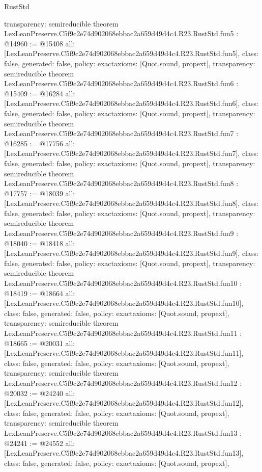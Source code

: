 \begin{lexlean}{RustStd}
\begin{coremodule}
{  transparency: semireducible
}
theorem LexLeanPreserve.C5f9c2e74d902068ebbac2a659d49d4c4.R23.RustStd.fun5 : @14960 := @15408 {
  all: [LexLeanPreserve.C5f9c2e74d902068ebbac2a659d49d4c4.R23.RustStd.fun5],
  class: false,
  generated: false,
  policy: exact{axioms: [Quot.sound, propext]},
  transparency: semireducible
}
theorem LexLeanPreserve.C5f9c2e74d902068ebbac2a659d49d4c4.R23.RustStd.fun6 : @15409 := @16284 {
  all: [LexLeanPreserve.C5f9c2e74d902068ebbac2a659d49d4c4.R23.RustStd.fun6],
  class: false,
  generated: false,
  policy: exact{axioms: [Quot.sound, propext]},
  transparency: semireducible
}
theorem LexLeanPreserve.C5f9c2e74d902068ebbac2a659d49d4c4.R23.RustStd.fun7 : @16285 := @17756 {
  all: [LexLeanPreserve.C5f9c2e74d902068ebbac2a659d49d4c4.R23.RustStd.fun7],
  class: false,
  generated: false,
  policy: exact{axioms: [Quot.sound, propext]},
  transparency: semireducible
}
theorem LexLeanPreserve.C5f9c2e74d902068ebbac2a659d49d4c4.R23.RustStd.fun8 : @17757 := @18039 {
  all: [LexLeanPreserve.C5f9c2e74d902068ebbac2a659d49d4c4.R23.RustStd.fun8],
  class: false,
  generated: false,
  policy: exact{axioms: [Quot.sound, propext]},
  transparency: semireducible
}
theorem LexLeanPreserve.C5f9c2e74d902068ebbac2a659d49d4c4.R23.RustStd.fun9 : @18040 := @18418 {
  all: [LexLeanPreserve.C5f9c2e74d902068ebbac2a659d49d4c4.R23.RustStd.fun9],
  class: false,
  generated: false,
  policy: exact{axioms: [Quot.sound, propext]},
  transparency: semireducible
}
theorem LexLeanPreserve.C5f9c2e74d902068ebbac2a659d49d4c4.R23.RustStd.fun10 : @18419 := @18664 {
  all: [LexLeanPreserve.C5f9c2e74d902068ebbac2a659d49d4c4.R23.RustStd.fun10],
  class: false,
  generated: false,
  policy: exact{axioms: [Quot.sound, propext]},
  transparency: semireducible
}
theorem LexLeanPreserve.C5f9c2e74d902068ebbac2a659d49d4c4.R23.RustStd.fun11 : @18665 := @20031 {
  all: [LexLeanPreserve.C5f9c2e74d902068ebbac2a659d49d4c4.R23.RustStd.fun11],
  class: false,
  generated: false,
  policy: exact{axioms: [Quot.sound, propext]},
  transparency: semireducible
}
theorem LexLeanPreserve.C5f9c2e74d902068ebbac2a659d49d4c4.R23.RustStd.fun12 : @20032 := @24240 {
  all: [LexLeanPreserve.C5f9c2e74d902068ebbac2a659d49d4c4.R23.RustStd.fun12],
  class: false,
  generated: false,
  policy: exact{axioms: [Quot.sound, propext]},
  transparency: semireducible
}
theorem LexLeanPreserve.C5f9c2e74d902068ebbac2a659d49d4c4.R23.RustStd.fun13 : @24241 := @24552 {
  all: [LexLeanPreserve.C5f9c2e74d902068ebbac2a659d49d4c4.R23.RustStd.fun13],
  class: false,
  generated: false,
  policy: exact{axioms: [Quot.sound, propext]},
}
\end{coremodule}
\end{lexlean}
